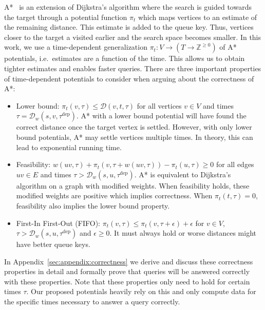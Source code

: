\documentclass[a4paper,UKenglish,cleveref, autoref, thm-restate,anonymous]{lipics-v2021}
\newcommand*{\dist}{\mathcal{D}}
\newcommand*{\tdep}{\tau^{\operatorname{dep}}}
\begin{document}
A*~\cite{hnr-afbhd-68} is an extension of Dijkstra's algorithm where the search is guided towards the target through a potential function $\pi_t$ which maps vertices to an estimate of the remaining distance.
This estimate is added to the queue key.
Thus, vertices closer to the target a visited earlier and the search space becomes smaller.
%
In this work, we use a time-dependent generalization $\pi_t : V \to (T \to \mathbb{Z}^{\geq 0})$ of A* potentials, i.e.\ estimates are a function of the time.
This allows us to obtain tighter estimates and enables faster queries.
There are three important properties of time-dependent potentials to consider when arguing about the correctness of A*:
\begin{itemize}
  \item Lower bound: $\pi_t(v, \tau) \leq \dist(v,t,\tau)$ for all vertices $v \in V$ and times $\tau = \dist_w(s,v,\tdep)$.
  A* with a lower bound potential will have found the correct distance once the target vertex is settled.
  However, with only lower bound potentials, A* may settle vertices multiple times.
  In theory, this can lead to exponential running time.
  \item Feasibility: $w(uv, \tau) + \pi_t(v, \tau + w(uv, \tau)) - \pi_t(u, \tau) \geq 0$ for all edges $uv \in E$ and times $\tau > \dist_w(s,u,\tdep)$.
  A* is equivalent to Dijkstra's algorithm on a graph with modified weights.
  When feasibility holds, these modified weights are positive which implies correctness.
  When $\pi_t(t, \tau) = 0$, feasibility also implies the lower bound property.
  \item First-In First-Out (FIFO): $\pi_t(v, \tau) \leq \pi_t(v, \tau + \epsilon) + \epsilon$ for $v \in V$, $\tau > \dist_w(s,u,\tdep)$ and $\epsilon \geq 0$.
  It must always hold or worse distances might have better queue keys.
\end{itemize}
In Appendix~\ref{sec:appendix:correctness} we derive and discuss these correctness properties in detail and formally prove that queries will be answered correctly with these properties.
Note that these properties only need to hold for certain times $\tau$.
Our proposed potentials heavily rely on this and only compute data for the specific times necessary to answer a query correctly.

\end{document}
